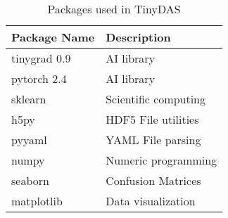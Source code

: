 \begin{table}[!htbp]
\centering
\caption{Packages used in TinyDAS}
\label{tab:tinydas-packages}
\small
\begin{tabular}{>{\raggedright\arraybackslash}p{}>{\raggedright\arraybackslash}p{}}
\toprule
\textbf{Package Name} & \textbf{Description} \\
\midrule
\rowcolor{gray!10} tinygrad 0.9 & AI library \\
pytorch 2.4 & AI library \\
\rowcolor{gray!10} sklearn & Scientific computing \\
h5py & HDF5 File utilities \\
\rowcolor{gray!10} pyyaml & YAML File parsing \\
numpy & Numeric programming \\
\rowcolor{gray!10} seaborn & Confusion Matrices \\
matplotlib & Data visualization \\
\bottomrule
\end{tabular}
\end{table}